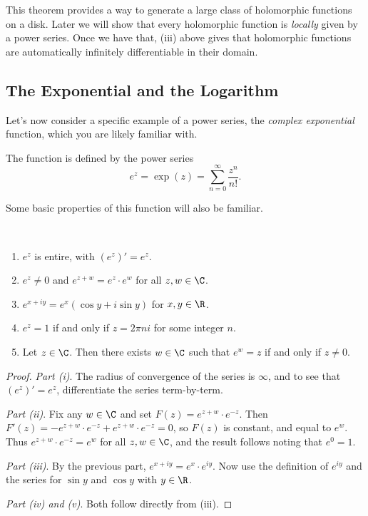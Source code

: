 \begin{remark}
    This theorem provides a way to generate a large class of holomorphic functions on a disk. Later we will show that every holomorphic function is \emph{locally} given by a power series. Once we have that, (iii) above gives that holomorphic functions are automatically infinitely differentiable in their domain.
\end{remark}

\subsection{The Exponential and the Logarithm}

Let's now consider a specific example of a power series, the \emph{complex exponential} function, which you are likely familiar with.

\begin{definition}
    The  function is defined by the power series
    $$
    e^z = \exp(z) = \sum_{n = 0}^{\infty} \frac{z^n}{n!}.
    $$
\end{definition}

Some basic properties of this function will also be familiar.

\begin{proposition}~
        \vspace*{-1.5\baselineskip}
    \begin{enumerate}[label=(\roman*)]
        \item $e^z$ is entire, with $(e^z)' = e^z$.
        \item $e^z \neq 0$ and $e^{z + w} = e^z  \cdot e^w$ for all $z, w \in \C$.
        \item $e^{x + iy} = e^x(\cos y + i \sin y)$ for $x, y \in \R$.
        \item $e^z = 1$ if and only if $z = 2\pi n i$ for some integer $n$.
        \item Let $z \in \C$. Then there exists $w \in \C$ such that $e^w = z$ if and only if $z \neq 0$.
    \end{enumerate}
\end{proposition}
\begin{proof}
    \emph{Part (i)}. The radius of convergence of the series is $\infty$, and to see that $(e^z)' = e^z$, differentiate the series term-by-term.

    \emph{Part (ii)}. Fix any $w \in \C$ and set $F(z) = e^{z + w} \cdot e^{-z}$. Then $F'(z) = - e^{z + w} \cdot e^{-z} + e^{z + w} \cdot e^{-z} = 0$, so $F(z)$ is constant, and equal to $e^w$. Thus $e^{z + w} \cdot e^{-z} = e^w$ for all $z, w \in \C$, and the result follows noting that $e^0 = 1$.

    \emph{Part (iii)}. By the previous part, $e^{x + iy} = e^x \cdot e^{iy}$. Now use the definition of $e^{iy}$ and the series for $\sin y$ and $\cos y$ with $y \in \R$.

    \emph{Part (iv) and (v)}. Both follow directly from (iii).
\end{proof}

